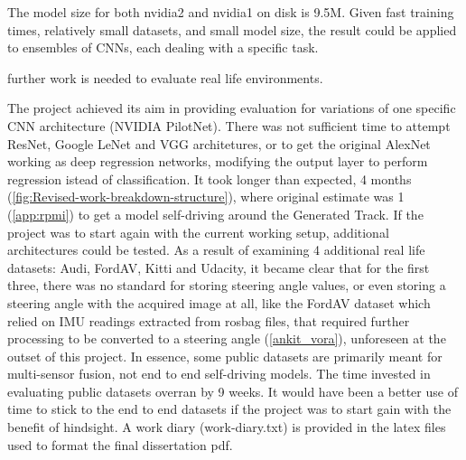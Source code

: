 The model size for both nvidia2 and nvidia1 on disk is 9.5M. Given fast training times, relatively small datasets, and small model size, the result could be applied to ensembles of CNNs, each dealing with a specific task.

further work is needed to evaluate real life environments. 

The project achieved its aim in providing evaluation for variations of one specific CNN architecture (NVIDIA PilotNet). There was not sufficient time to attempt ResNet, Google LeNet and VGG architetures, or to get the original AlexNet working as deep regression networks, modifying the output layer to perform regression istead of classification. It took longer than expected, 4 months (\ref{fig:Revised-work-breakdown-structure}), where original estimate was 1 (\ref{app:rpmi}) to get a model self-driving around the Generated Track. If the project was to start again with the current working setup, additional architectures could be tested. As a result of examining 4 additional real life datasets: Audi, FordAV, Kitti and Udacity, it became clear that for the first three, there was no standard for storing steering angle values, or even storing a steering angle with the acquired image at all, like the FordAV dataset which relied on IMU readings extracted from rosbag files, that required further processing to be converted to a steering angle (\ref{ankit_vora}), unforeseen at the outset of this project. In essence, some public datasets are primarily meant for multi-sensor fusion, not end to end self-driving models. The time invested in evaluating public datasets overran by 9 weeks. It would have been a better use of time to stick to the end to end datasets if the project was to start gain with the benefit of hindsight. A work diary (work-diary.txt) is provided in the latex files used to format the final dissertation pdf.

  
